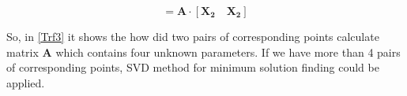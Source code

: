 \begin{equation}[\mathbf{x_1} \quad \mathbf{x_2}]=
\mathbf{A}\cdot [\mathbf{X_2} \quad \mathbf{X_2}]
\label{Trf3}
\end{equation}

So, in \eqref{Trf3} it shows the how did two pairs of corresponding points calculate matrix $\mathbf{A}$ which contains four unknown parameters. If we have more than 4 pairs of corresponding points, SVD method for minimum solution finding could be applied.





